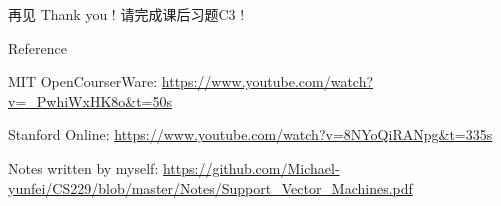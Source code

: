 \documentclass[handout]{ctexbeamer}
\begin{document}
\begin{frame}{再见}
	Thank you !  请完成课后习题C3 !
\end{frame}



\begin{frame}[allowframebreaks]{Reference}
  
  
  MIT OpenCourserWare: \url{https://www.youtube.com/watch?v=_PwhiWxHK8o&t=50s} 
  
  Stanford Online: \url{https://www.youtube.com/watch?v=8NYoQiRANpg&t=335s}
  
  Notes written by myself: \url{https://github.com/Michael-yunfei/CS229/blob/master/Notes/Support_Vector_Machines.pdf} 
\end{frame}
\end{document}

